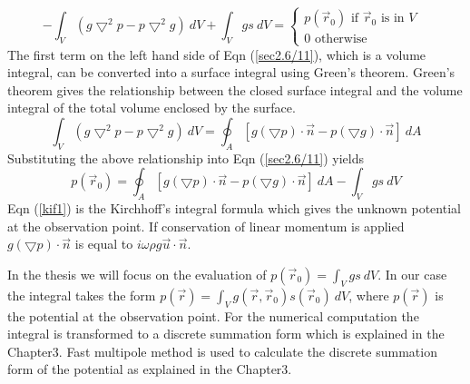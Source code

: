 \begin{equation}
\label{sec2.6/11}
-\int_{V} ({g\bigtriangledown^2p - p\bigtriangledown^2g})~dV +\int_{V}gs ~ dV
= \begin{cases}
p(\vec{r}_0)\text{ if $\vec{r}_0$ is in $V$ }\\
0 \text{ otherwise}
\end{cases}
\end{equation}
The first term on the left hand side of Eqn (\ref{sec2.6/11}), which is a volume integral, can be converted into a  surface integral using Green's theorem.  Green's theorem gives the  relationship between the closed surface integral and the volume integral of the total volume enclosed by the surface.
 \begin{equation}
\label{sec2.6/13}
\int_{V} ({g\bigtriangledown^2p - p\bigtriangledown^2g}) ~dV =\oint_{A}\left[g(\bigtriangledown p)\cdot \vec{n} -  p(\bigtriangledown g) \cdot \vec{n}    \right]~dA 
\end{equation}
Substituting the above relationship into Eqn (\ref{sec2.6/11}) yields
\begin{equation}
\label{kif1}
 p(\vec{r}_0) =  \oint_{A}\left[g(\bigtriangledown p)\cdot \vec{n} -  p(\bigtriangledown g) \cdot \vec{n}    \right]~dA- \int_{V}gs ~ dV
\end{equation}
Eqn (\ref{kif1}) is the Kirchhoff's integral formula which gives the unknown potential  at the observation point.
If conservation of linear momentum is applied 
$ g(\bigtriangledown p)\cdot \vec{n}$ is equal to
$ i \omega \rho  g \vec{u}\cdot \vec{n}$.
\par In the thesis we will focus on the evaluation of $ p(\vec{r}_0)= \int_{V}gs  ~dV$.
In our  case the integral takes the form $ p(\vec{r})= \int_{V}g(\vec{r},\vec{r}_0)s(\vec{r}_0) ~ dV$, where $ p(\vec{r})$ is the potential at the observation point. For the numerical computation the integral is transformed  to a discrete summation form   which is explained in the Chapter$3$.  Fast multipole method is used to calculate the discrete summation form of the potential as explained in the Chapter$3$.
\newpage




